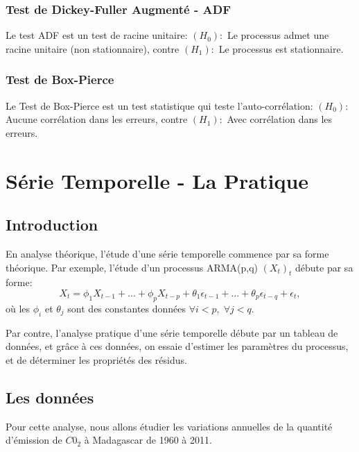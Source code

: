 \documentclass{article}
\begin{document}
\subsubsection{Test de Dickey-Fuller Augmenté - ADF}
Le test ADF est un test de racine unitaire:
\newline
$(H_0):$ Le processus admet une racine unitaire (non stationnaire), contre
\newline
$(H_1):$ Le processus est stationnaire.

\subsubsection{Test de Box-Pierce}
Le Test de Box-Pierce est un test statistique qui teste l'auto-corrélation:
\newline
$(H_0):$ Aucune corrélation dans les erreurs, contre
\newline
$(H_1):$ Avec corrélation dans les erreurs.
\newpage

\section{Série Temporelle - La Pratique}

\subsection{Introduction}
En analyse théorique, l'étude d'une série temporelle commence par sa forme théorique. Par exemple, l'étude d'un processus ARMA(p,q) $(X_t)_t$ débute par sa forme:
$$X_t=\phi_1{X_{t-1}}+...+\phi_p{X_{t-p}}+\theta_1{\epsilon_{t-1}}+...+\theta_p{\epsilon_{t-q}}+\epsilon_t,$$
où les $\phi_i$ et $\theta_j$ sont des constantes données $\forall i<p, \; \forall j<q$.
\newline

Par contre, l'analyse pratique d'une série temporelle débute par un tableau de données, et grâce à ces données, on essaie d'estimer les paramètres du processus, et de déterminer les propriétés des résidus.

\subsection{Les données}
Pour cette analyse, nous allons étudier les variations annuelles de la quantité d'émission de $C0_2$ à Madagascar de 1960 à 2011.
\end{document}
